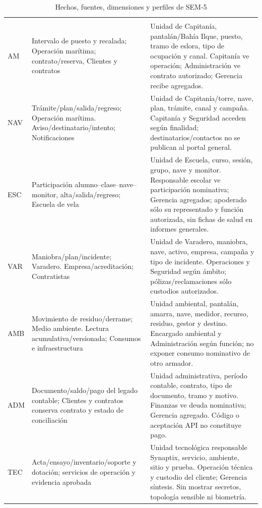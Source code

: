 \begin{longtable}{@{}L{.13\linewidth}L{.28\linewidth}L{\dimexpr.59\tabcolsep\relax}@{}}
\caption{Hechos, fuentes, dimensiones y perfiles de SEM-5}\label{tab:sem5_hechos}\\\hline
{} &  & \\\hline
\endfirsthead
\hline{} &  & \\\hline\endhead
AM & Intervalo de puesto y recalada; Operación marítima; contrato/reserva, Clientes y contratos & Unidad de Capitanía, pantalán/Bahía Ilque, puesto, tramo de eslora, tipo de ocupación y canal. Capitanía ve operación; Administración ve contrato autorizado; Gerencia recibe agregados.\\\hline
NAV & Trámite/plan/salida/regreso; Operación marítima. Aviso/destinatario/intento; Notificaciones & Unidad de Capitanía/torre, nave, plan, trámite, canal y campaña. Capitanía y Seguridad acceden según finalidad; destinatarios/contactos no se publican al portal general.\\\hline
ESC & Participación alumno--clase--nave--monitor, alta/salida/regreso; Escuela de vela & Unidad de Escuela, curso, sesión, grupo, nave y monitor. Responsable escolar ve participación nominativa; Gerencia agregados; apoderado sólo su representado y función autorizada, sin fichas de salud en informes generales.\\\hline
VAR & Maniobra/plan/incidente; Varadero. Empresa/acreditación; Contratistas & Unidad de Varadero, maniobra, nave, activo, empresa, campaña y tipo de incidente. Operaciones y Seguridad según ámbito; pólizas/reclamaciones sólo custodios autorizados.\\\hline
AMB & Movimiento de residuo/derrame; Medio ambiente. Lectura acumulativa/versionada; Consumos e infraestructura & Unidad ambiental, pantalán, amarra, nave, medidor, recurso, residuo, gestor y destino. Encargado ambiental y Administración según función; no exponer consumo nominativo de otro armador.\\\hline
ADM & Documento/saldo/pago del legado contable; Clientes y contratos conserva contrato y estado de conciliación & Unidad administrativa, período contable, contrato, tipo de documento, tramo y motivo. Finanzas ve deuda nominativa; Gerencia agregado. Código o aceptación API no constituye pago.\\\hline
TEC & Acta/\allowbreak{}ensayo/\allowbreak{}inventario/\allowbreak{}soporte y dotación; servicios de operación y evidencia aprobada & Unidad tecnológica responsable Synaptix, servicio, ambiente, sitio y prueba. Operación técnica y custodio del cliente; Gerencia síntesis. Sin mostrar secretos, topología sensible ni biometría.\\\hline
\end{longtable}

